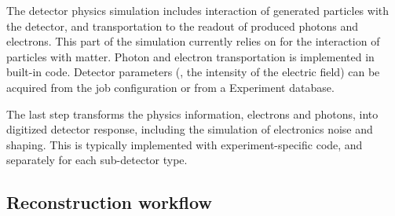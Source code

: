 The detector physics simulation includes interaction of 
generated particles with the detector,
and transportation to the readout of produced photons and electrons.
This part of the simulation currently relies on \GEANT for the interaction of particles with matter.
Photon and electron transportation is implemented in built-in code.
Detector parameters (\eg, the intensity of the electric field)
can be acquired from the job configuration or from a Experiment database.

The last step transforms the physics information, electrons and photons,
into digitized detector response,
including the simulation of electronics noise and shaping.
This is typically implemented with experiment-specific code,
and separately for each sub-detector type.


\subsection{Reconstruction workflow}
\label{ssec:Workflows:Reconstruction}

